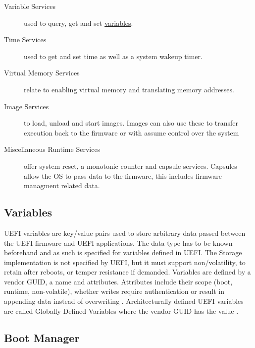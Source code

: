 \begin{description}
    \item [Variable Services] used to query, get and set \hyperref[sec:uefi-pi:uefi:variables]{variables}.
    \item [Time Services] used to get and set time as well as a system wakeup timer.
    \item [Virtual Memory Services] relate to enabling virtual memory and translating memory addresses.
    \item [Image Services] to load, unload and start images. Images can also use these to transfer execution back to the firmware or with  assume control over the system
    \item [Miscellaneous Runtime Services] offer system reset, a monotonic counter and capsule services. Capsules allow the \ac{OS} to pass data to the firmware, this includes firmware managment related data.
\end{description}

\subsection{Variables}
\label{sec:uefi-pi:uefi:variables}

\ac{UEFI} variables are key/value pairs used to store arbitrary data passed between the \ac{UEFI} firmware and \ac{UEFI} applications.
The data type has to be known beforehand and as such is specified for variables defined in \ac{UEFI}.
The Storage implementation is not specified by \ac{UEFI}, but it must support non\-/volatility, to retain after reboots, or temper resistance if demanded.
Variables are defined by a vendor \ac{GUID}, a name and attributes.
Attributes include their scope (boot, runtime, non-volatile), whether writes require authentication or result in appending data instead of overwriting \cite[Section 8.2]{uefi-spec}.
Architecturally defined \ac{UEFI} variables are called Globally Defined Variables where the vendor \ac{GUID} has the value  \cite[Section 3.3]{uefi-spec}.

\subsection{Boot Manager}
\label{sec:uefi-pi:uefi:boot-manager}

